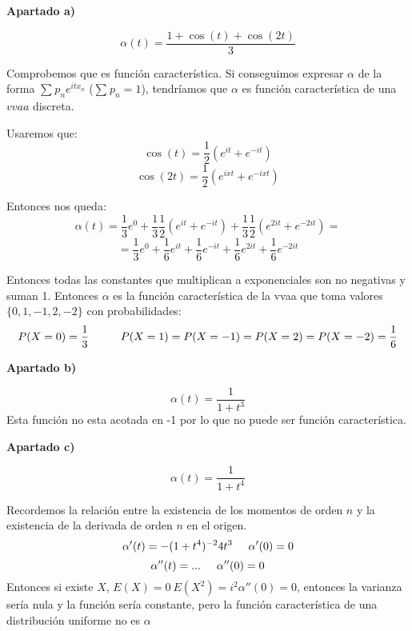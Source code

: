 \documentclass[openany]{book}
\begin{document}
\begin{exercise}
    $  $
    \begin{flushright}
        \textbf{Apartado a)}
    \end{flushright}

    $$ \alpha (t) = \dfrac{1+\cos(t)+\cos(2t)}{3} $$
    
    Comprobemos que es función característica. Si conseguimos expresar $ \alpha $ de la forma $ \sum\limits_{}^{} p_n e^{itx_n} $ ($ \sum\limits_{}^{} p_n = 1  $), tendríamos que $ \alpha $ es función característica de una $ vvaa $ discreta.

    Usaremos que:
    $$ \cos(t) = \dfrac{1}{2} \left( e^{it} + e^{-it}\right)  $$
    $$ \cos(2t) = \dfrac{1}{2} \left( e^{ixt}+e^{-ixt} \right) $$

    Entonces nos queda:
    $$ \alpha(t) = \dfrac{1}{3} e^{0} +\dfrac{1}{3} \dfrac{1}{2} (e^{it}+e^{-it})+\dfrac{1}{3} \dfrac{1}{2} (e^{2it}+e^{-2it}) = $$
    $$ = \dfrac{1}{3} e^{0} +\dfrac{1}{6} e^{it}+\dfrac{1}{6}e^{-it}+\dfrac{1}{6}e^{2it}+\dfrac{1}{6}e^{-2it} $$

    Entonces todas las constantes que multiplican a exponenciales son no negativas y suman 1. Entonces $ \alpha $ es la función característica de la vvaa que toma valores $ \{0,1,-1,2,-2\} $ con probabilidades:
    $$ P(X=0) = \dfrac{1}{3}\hspace{10mm} P(X=1)=P(X=-1)=P(X=2)=P(X=-2) = \dfrac{1}{6} $$

    \begin{flushright}
        \textbf{Apartado b)}
    \end{flushright}

    $$ \alpha(t) = \dfrac{1}{1+t^3} $$
    Esta función no esta acotada en -1 por lo que no puede ser función característica.


    \begin{flushright}
        \textbf{Apartado c)}
    \end{flushright}

    $$ \alpha(t) = \dfrac{1}{1+t^4} $$

    Recordemos la relación entre la existencia de los momentos de orden $ n $ y la existencia de la derivada de orden $ n $ en el origen.
    $$ \alpha'(t) = -(1+t ^{4})^{-2}4t^3 \hspace{5mm} \alpha'(0) = 0 $$
    $$ \alpha''(t) = ... \hspace{5mm} \alpha''(0) = 0  $$
    Entonces si existe $ X $, $E(X)=0\ E(X^2) = i^2 \alpha''(0) = 0 $, entonces la varianza sería nula y la función sería constante, pero la función característica de una distribución uniforme no es $ \alpha $



\end{exercise}
\end{document}
